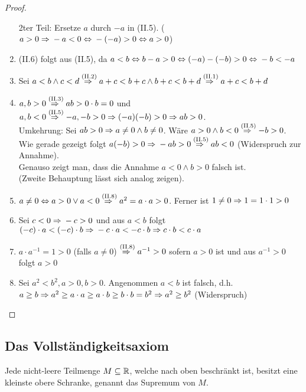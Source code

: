 \begin{satz}
\begin{proof}
\begin{enumerate}[label=(II.\arabic*)]
            2ter Teil: Ersetze $a$ durch $-a$ in (II.5). ($a>0 \Rightarrow{} -a < 0 \Leftrightarrow{} -(-a)>0 \Leftrightarrow{} a >0$)
            \item (II.6) folgt aus (II.5), da $a<b\Leftrightarrow{} b-a>0 \Leftrightarrow{} (-a)-(-b) > 0\Leftrightarrow{} -b < -a$
            \item Sei $a<b \land c < d \overset{\text{(II.2)}}{\Rightarrow{}} a + c < b + c \land b + c < b + d \overset{\text{(II.1)}}{\Rightarrow{}} a+c < b + d$
            \item $a,b>0 \overset{\text{(II.3)}}{\Rightarrow{}} ab > 0\cdot b = 0$ und $a,b<0 \overset{\text{(II.5)}}{\Rightarrow{}} -a,-b>0 \Rightarrow{} (-a)(-b) > 0 \Rightarrow{} ab > 0$.\\
            Umkehrung: Sei $ab>0 \Rightarrow{} a\neq 0 \land b \neq 0$. Wäre $a>0 \land b < 0 \overset{\text{(II.5)}}{\Rightarrow{}} -b>0$. Wie gerade gezeigt folgt $a(-b) > 0 \Rightarrow{} -ab > 0 \overset{\text{(II.5)}}{\Rightarrow{}} ab < 0$ (Widerspruch zur Annahme).\\
            Genauso zeigt man, dass die Annahme $a<0 \land b > 0$ falsch ist.\\
            (Zweite Behauptung lässt sich analog zeigen).
            \item $a\neq 0 \Leftrightarrow{} a > 0 \lor a < 0 \overset{\text{(II.8)}}{\Rightarrow{}} a^2 = a \cdot a > 0$. Ferner ist $1\neq 0 \Rightarrow{} 1=1\cdot 1 > 0$
            \item Sei $c<0 \Rightarrow{} -c > 0$ und aus $a<b$ folgt $(-c)\cdot a < (-c)\cdot b \Rightarrow{} -c\cdot a < -c\cdot b \Rightarrow{} c\cdot b < c\cdot a$
            \item $a\cdot a^{-1} = 1 > 0$ (falls $a\neq 0$) $\overset{\text{(II.8)}}{\Rightarrow{}} a^{-1} > 0$ sofern $a>0$ ist und aus $a^{-1}>0$ folgt $a>0$
            \item Sei $a^{2}<b^2, a>0, b>0$. Angenommen $a<b$ ist falsch, d.h. $a\geq b \Rightarrow{} a^{2} \geq a \cdot a \geq a\cdot b\geq b\cdot b = b^{2}\Rightarrow{} a^{2}\geq b^{2}$ (Widerspruch)
        \end{enumerate}
    \end{proof}
\end{satz}

\newpage

\subsection{Das Vollständigkeitsaxiom}

\begin{axiom}[Vollständigkeitsaxiom]
    \label{axiom:vollstaendigkeitsaxiom}
    Jede nicht-leere Teilmenge $M\subseteq \mathbb{R}$, welche nach oben beschränkt ist, besitzt eine kleinste obere Schranke, genannt das Supremum von $M$.
\end{axiom}

